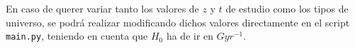 \documentclass[twoside]{article}
\begin{document}
				En caso de querer variar tanto los valores de $z$ y $t$ de estudio como los tipos de universo, se podrá realizar modificando dichos valores directamente en el script \texttt{main.py}, teniendo en cuenta que $H_0$ ha de ir en $Gyr^{-1}$.

	\nocite{Calculadoras}
	\nocite{codigo}

	
	
\end{document}
